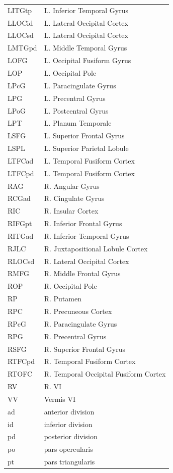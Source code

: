 \documentclass{llncs}
\begin{document}
\begin{figure}[htb]
\begin{minipage}[b]{.4\linewidth}
\begin{tabular}{l l}
LITGtp	& L. Inferior Temporal Gyrus\\
LLOCid	& L. Lateral Occipital Cortex\\
LLOCsd	& L. Lateral Occipital Cortex\\
LMTGpd	& L. Middle Temporal Gyrus\\
LOFG	& L. Occipital Fusiform Gyrus\\
LOP	& L. Occipital Pole\\
LPcG	& L. Paracingulate Gyrus\\
LPG	& L. Precentral Gyrus\\
LPoG	& L. Postcentral Gyrus\\
LPT	& L. Planum Temporale\\
LSFG	& L. Superior Frontal Gyrus\\
LSPL	& L. Superior Parietal Lobule\\
LTFCad	& L. Temporal Fusiform Cortex\\
LTFCpd	& L. Temporal Fusiform Cortex\\
RAG	& R. Angular Gyrus\\
RCGad	& R. Cingulate Gyrus\\
RIC	& R. Insular Cortex\\
RIFGpt	& R. Inferior Frontal Gyrus\\
RITGad	& R. Inferior Temporal Gyrus\\
RJLC	& R. Juxtapositional Lobule Cortex\\
RLOCsd	& R. Lateral Occipital Cortex\\
RMFG	& R. Middle Frontal Gyrus\\
ROP	& R. Occipital Pole\\
RP	& R. Putamen\\
RPC	& R. Precuneous Cortex\\
RPcG	& R. Paracingulate Gyrus\\
RPG	& R. Precentral Gyrus\\
RSFG	& R. Superior Frontal Gyrus\\
RTFCpd	& R. Temporal Fusiform Cortex\\
RTOFC	& R. Temporal Occipital Fusiform Cortex\\
RV	& R. VI\\
VV	& Vermis VI\\
\hline
ad & anterior division\\
id & inferior division\\
pd & posterior division\\
po & pars opercularis\\
pt & pars triangularis\\

\end{tabular}
\end{minipage}
\end{figure}
\end{document}
